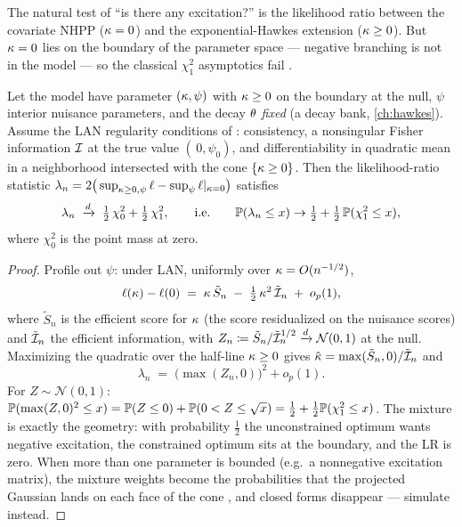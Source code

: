 The natural test of ``is there any excitation?'' is the likelihood ratio
between the covariate NHPP ($\kappa=0$) and the exponential-Hawkes
extension ($\kappa\ge 0$). But $\kappa=0$ lies on the boundary of the
parameter space --- negative branching is not in the model --- so the
classical $\chi^2_1$ asymptotics fail \citep{selfliang1987}.

\begin{theorem}\label{thm:ch07:chibar}
Let the model have parameter $(\kappa,\psi)$ with $\kappa\ge 0$ on the
boundary at the null, $\psi$ interior nuisance parameters, and the decay
$\theta$ \emph{fixed} (a decay bank, \cref{ch:hawkes}). Assume the LAN
regularity conditions of \citet{selfliang1987}: consistency, a
nonsingular Fisher information $\mathcal{I}$ at the true value
$(\,0,\psi_0)$, and differentiability in quadratic mean in a neighborhood
intersected with the cone $\{\kappa\ge0\}$. Then the likelihood-ratio
statistic $\lambda_n = 2\big(\sup_{\kappa\ge0,\psi}\ell -
\sup_{\psi}\ell|_{\kappa=0}\big)$ satisfies
\begin{equation}\label{eq:ch07:chibar}
\lambda_n \;\xrightarrow{d}\;
\tfrac12\,\chi^2_0 + \tfrac12\,\chi^2_1,
\qquad\text{i.e.}\qquad
\mathbb{P}(\lambda_n \le x) \to \tfrac12 + \tfrac12\,\mathbb{P}(\chi^2_1\le x),
\end{equation}
where $\chi^2_0$ is the point mass at zero.
\end{theorem}

\begin{proof}
Profile out $\psi$: under LAN, uniformly over
$\kappa = O(n^{-1/2})$,
\[
\ell(\kappa) - \ell(0)
 \;=\; \kappa\,\tilde S_n \;-\; \tfrac12\,\kappa^2\,\tilde{\mathcal{I}}_n
 \;+\; o_p(1),
\]
where $\tilde S_n$ is the efficient score for $\kappa$ (the score
residualized on the nuisance scores) and $\tilde{\mathcal{I}}_n$ the efficient
information, with $Z_n \coloneqq \tilde S_n/\tilde{\mathcal{I}}_n^{1/2}
\xrightarrow{d} \mathcal{N}(0,1)$ at the null. Maximizing the quadratic
over the half-line $\kappa\ge0$ gives
$\hat{\kappa} = \max(\tilde S_n,0)/\tilde{\mathcal{I}}_n$ and
\[
\lambda_n \;=\; \big(\max(Z_n,0)\big)^2 + o_p(1).
\]
For $Z\sim\mathcal{N}(0,1)$:\ $\mathbb{P}(\max(Z,0)^2 \le x) = \mathbb{P}(Z\le 0) +
\mathbb{P}(0<Z\le\sqrt{x}) = \tfrac12 + \tfrac12\mathbb{P}(\chi^2_1\le x)$. The
mixture is exactly the geometry: with probability $\tfrac12$ the
unconstrained optimum wants negative excitation, the constrained optimum
sits at the boundary, and the LR is zero. When more than one parameter is
bounded (e.g.\ a nonnegative excitation matrix), the mixture weights
become the probabilities that the projected Gaussian lands on each face
of the cone \citep{selfliang1987}, and closed forms disappear ---
simulate instead.
\end{proof}

